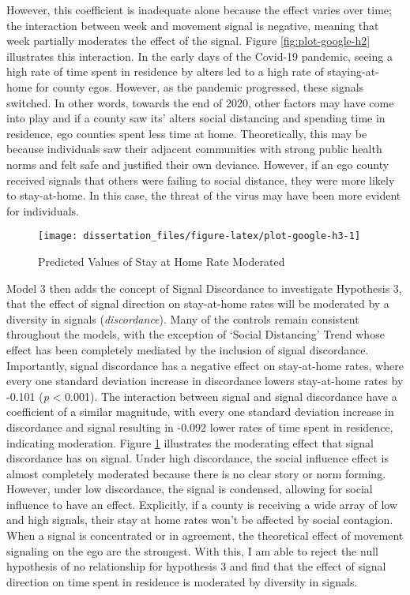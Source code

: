 However, this coefficient is inadequate alone because the effect varies over
time; the interaction between week and movement signal is negative, meaning that
week partially moderates the effect of the signal. Figure
\ref{fig:plot-google-h2} illustrates this interaction. In the early days of the
Covid-19 pandemic, seeing a high rate of time spent in residence by alters led
to a high rate of staying-at-home for county egos. However, as the pandemic
progressed, these signals switched. In other words, towards the end of 2020,
other factors may have come into play and if a county saw its' alters social
distancing and spending time in residence, ego counties spent less time at home.
Theoretically, this may be because individuals saw their adjacent communities
with strong public health norms and felt safe and justified their own deviance.
However, if an ego county received signals that
others were failing to social distance, they were more likely to stay-at-home.
In this case, the threat of the virus may have been more evident for
individuals.

\begin{figure}

{\centering \texttt{[image: dissertation\_files/figure-latex/plot-google-h3-1]} 

}

\caption{Predicted Values of Stay at Home Rate Moderated}\label{fig:plot-google-h3}
\end{figure}

Model 3 then adds the concept of Signal Discordance to investigate Hypothesis 3,
that the effect of signal direction on stay-at-home rates will be moderated by a
diversity in signals (\emph{discordance}). Many of the controls remain consistent
throughout the models, with the exception of `Social Distancing' Trend whose
effect has been completely mediated by the inclusion of signal discordance.
Importantly, signal discordance has a negative effect on stay-at-home rates,
where every one standard deviation increase in discordance lowers stay-at-home rates by
-0.101
(\emph{p} \textless{} 0.001). The interaction between signal and signal discordance have a
coefficient of a similar magnitude, with every one standard deviation increase
in discordance and signal resulting in
-0.092
lower rates of time spent in residence, indicating moderation. Figure
\ref{fig:plot-google-h3} illustrates the moderating effect that signal
discordance has on signal. Under high discordance, the social influence effect
is almost completely moderated because there is no clear story or norm forming.
However, under low discordance, the signal is condensed, allowing for social
influence to have an effect. Explicitly, if a county is receiving a wide array
of low and high signals, their stay at home rates won't be affected by social
contagion. When a signal is concentrated or in agreement, the theoretical effect
of movement signaling on the ego are the strongest. With this, I am able to
reject the null hypothesis of no relationship for hypothesis 3 and find that the
effect of signal direction on time spent in residence is moderated by diversity
in signals.

